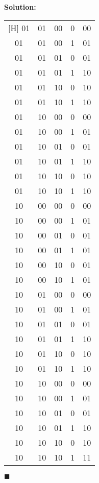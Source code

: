 \documentclass{article}
\newenvironment{solution}                               %
{\textbf{Solution:} \\}{$\blacksquare$\newline}         %
\begin{document}
\begin{solution}
\begin{center}
\begin{tabular}{|c|c|c|c|c|}[H]
                01 	&	 01 	&	 00 	&	 0 	&	 00 \\ 
                01 	&	 01 	&	 00 	&	 1 	&	 01 \\ \hline
                01 	&	 01 	&	 01 	&	 0 	&	 01 \\ 
                01 	&	 01 	&	 01 	&	 1 	&	 10 \\ \hline
                01 	&	 01 	&	 10 	&	 0 	&	 10 \\ 
                01 	&	 01 	&	 10 	&	 1 	&	 10 \\ \hline
                01 	&	 10 	&	 00 	&	 0 	&	 00 \\ 
                01 	&	 10 	&	 00 	&	 1 	&	 01 \\ \hline
                01 	&	 10 	&	 01 	&	 0 	&	 01 \\ 
                01 	&	 10 	&	 01 	&	 1 	&	 10 \\ \hline
                01 	&	 10 	&	 10 	&	 0 	&	 10 \\ 
                01 	&	 10 	&	 10 	&	 1 	&	 10 \\ \hline
                10 	&	 00 	&	 00 	&	 0 	&	 00 \\ 
                10 	&	 00 	&	 00 	&	 1 	&	 01 \\ \hline
                10 	&	 00 	&	 01 	&	 0 	&	 01 \\ 
                10 	&	 00 	&	 01 	&	 1 	&	 01 \\ \hline
                10 	&	 00 	&	 10 	&	 0 	&	 01 \\ 
                10 	&	 00 	&	 10 	&	 1 	&	 01 \\ \hline
                10 	&	 01 	&	 00 	&	 0 	&	 00 \\ 
                10 	&	 01 	&	 00 	&	 1 	&	 01 \\ \hline
                10 	&	 01 	&	 01 	&	 0 	&	 01 \\ 
                10 	&	 01 	&	 01 	&	 1 	&	 10 \\ \hline
                10 	&	 01 	&	 10 	&	 0 	&	 10 \\ 
                10 	&	 01 	&	 10 	&	 1 	&	 10 \\ \hline
                10 	&	 10 	&	 00 	&	 0 	&	 00 \\ 
                10 	&	 10 	&	 00 	&	 1 	&	 01 \\ \hline
                10 	&	 10 	&	 01 	&	 0 	&	 01 \\ 
                10 	&	 10 	&	 01 	&	 1 	&	 10 \\ \hline
                10 	&	 10 	&	 10 	&	 0 	&	 10 \\ 
                10 	&	 10 	&	 10 	&	 1 	&	 11 \\ \hline
            \end{tabular}
        \end{center}
    \end{solution}
\end{document}
